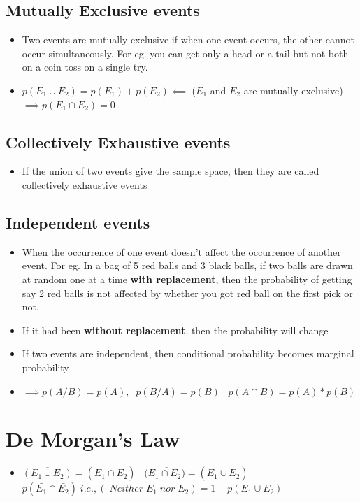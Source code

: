 \documentclass[8pt]{report}
\begin{document}
	\subsection{Mutually Exclusive events}
		\begin{itemize}
			\item Two events are mutually exclusive if when one event occurs, the other cannot occur simultaneously. For eg. you can get only a head or a tail but not both on a coin toss on a single try.
			\item $\boxed{p(E_1\cup E_2)=p(E_1)+p(E_2)}\impliedby$ ($E_1$ and $E_2$ are mutually exclusive) $\implies\boxed{p(E_1\cap E_2) = 0}$
		\end{itemize}
	\subsection{Collectively Exhaustive events}
		\begin{itemize}
			\item If the union of two events give the sample space, then they are called collectively exhaustive events
		\end{itemize}
	\subsection{Independent events}
		\begin{itemize}
			\item When the occurrence of one event doesn't affect the occurrence of another event. For eg. In a bag of 5 red balls and 3 black balls, if two balls are drawn at random one at a time \textbf{with replacement}, then the probability of getting say 2 red balls is not affected by whether you got red ball on the first pick or not. 
			\item If it had been \textbf{without replacement}, then the probability will change
			\item If two events are independent, then conditional probability becomes marginal probability 
			\item $\implies p(A/B) = p(A),\;\;p(B/A) = p(B)\;\;\;\boxed{p(A\cap B) = p(A)*p(B)}$
		\end{itemize}\hrulefill
\section{De Morgan's Law}
	\begin{itemize}
		\item $\boxed{\overline{(E_1\cup E_2)} = (\bar{E_1}\cap \bar{E_2})}\;\;\;\boxed{(\overline{E_1\cap E_2)} = (\bar{E_1}\cup \bar{E_2})}\;\;\;$ $\boxed{p(\bar{E_1}\cap \bar{E_2})\;i.e.,(\;Neither\;E_1\;nor\;E_2) = 1 - p(E_1\cup E_2)}$
	\end{itemize}\hrulefill
\end{document}
